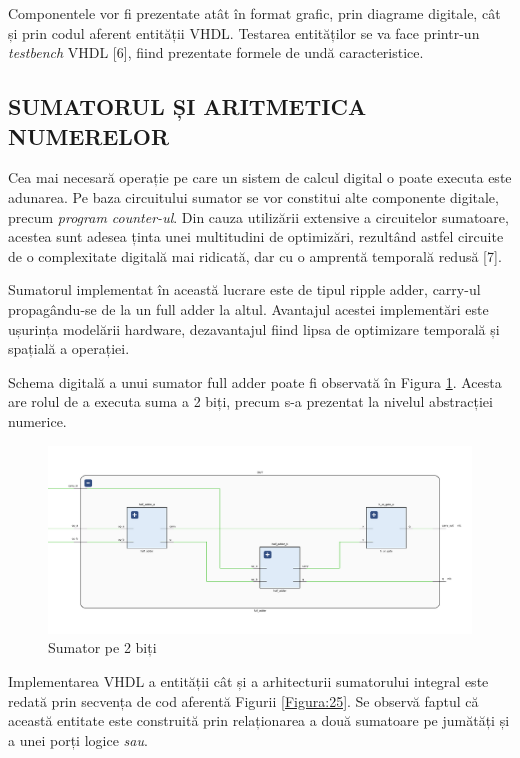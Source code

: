 \documentclass[12pt]{article}
\begin{document}
Componentele vor fi prezentate atât în format grafic, prin diagrame digitale, cât și prin codul aferent entității VHDL. Testarea entităților se va face printr-un \textit{testbench} VHDL [6], fiind prezentate formele de undă caracteristice.

 \subsection{SUMATORUL ȘI ARITMETICA NUMERELOR}
 Cea mai necesară operație pe care un sistem de calcul digital o poate executa este adunarea. Pe baza circuitului sumator se vor constitui alte componente digitale, precum \textit{program counter-ul}. Din cauza utilizării extensive a circuitelor sumatoare, acestea sunt adesea ținta unei multitudini de optimizări, rezultând astfel circuite de o complexitate digitală mai ridicată, dar cu o amprentă temporală redusă [7].
 
Sumatorul implementat în această lucrare este de tipul ripple adder, carry-ul propagându-se de la un full adder la altul. Avantajul acestei implementări este ușurința modelării hardware, dezavantajul fiind lipsa de optimizare temporală și spațială a operației.

Schema digitală a unui sumator full adder poate fi observată în Figura \ref{Figura:16}. Acesta are rolul de a executa suma a 2 biți, precum s-a prezentat la nivelul abstracției numerice.

 \begin{figure}[h!]
 \includegraphics[width=1.03\textwidth]{fulladderVHDL.png}
 \centering
 \caption{Sumator pe 2 biți}
 \label{Figura:16}
 \end{figure}

Implementarea VHDL a entității cât și a arhitecturii sumatorului integral este redată prin secvența de cod aferentă Figurii \ref{Figura:25}. Se observă faptul că această entitate este construită prin relaționarea a două sumatoare pe jumătăți și a unei porți logice \textit{sau}.
\end{document}
